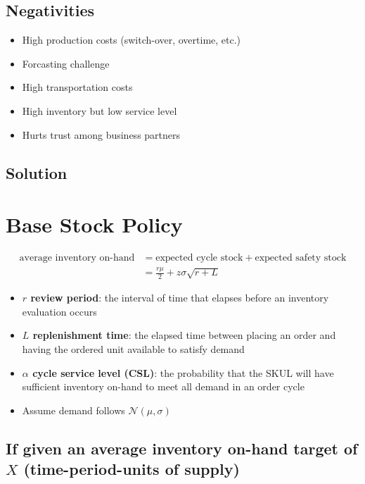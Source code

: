 \documentclass[11pt]{article}
\begin{document}
\subsection{Negativities}

\begin{itemize}
    \item High production costs (switch-over, overtime, etc.)
    \item Forcasting challenge
    \item High transportation costs
    \item High inventory but low service level
    \item Hurts trust among business partners
\end{itemize}

\subsection{Solution}


\section{Base Stock Policy}

\begin{equation}
\begin{split}
    \text{average inventory on-hand} &= \text{expected cycle stock} + \text{expected safety stock} \\
    &= \frac{r \mu}{2} + z \sigma \sqrt{r + L}
\end{split}
\end{equation}

\begin{itemize}
    \item \textbf{$r$ review period}: the interval of time that elapses before an inventory evaluation occurs
    \item \textbf{$L$ replenishment time}: the elapsed time between placing an order and having the ordered unit available to satisfy demand
    \item \textbf{$\alpha$ cycle service level (CSL)}: the probability that the SKUL will have sufficient inventory on-hand to meet all demand in an order cycle
    \item Assume demand follows $\mathcal{N}(\mu, \sigma)$
\end{itemize}

\subsection{If given an average inventory on-hand target of $X$  (time-period-units of supply)}
\end{document}
